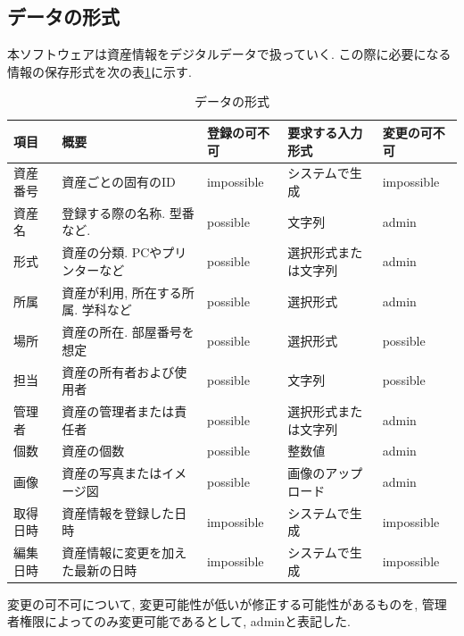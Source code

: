 \documentclass[11ptm]{jsarticle}
\begin{document}
\subsection{データの形式}
\label{subsec:データの形式}
本ソフトウェアは資産情報をデジタルデータで扱っていく. この際に必要になる情報の保存形式を次の表\ref{tb:データの形式}に示す.
\begin{table}[h]
  \caption{データの形式}
  \label{tb:データの形式}
  \centering
  \begin{tabular}{@{}l|l|l|l|l@{}}
    項目     & 概要                               & 登録の可不可 & 要求する入力形式     & 変更の可不可 \\
    \hline\hline
    資産番号 & 資産ごとの固有のID                 & impossible   & システムで生成       & impossible   \\
    \hline
    資産名   & 登録する際の名称. 型番など.        & possible     & 文字列               & admin        \\
    \hline
    形式     & 資産の分類. PCやプリンターなど     & possible     & 選択形式または文字列 & admin        \\
    \hline
    所属     & 資産が利用, 所在する所属. 学科など & possible     & 選択形式             & admin        \\
    \hline
    場所     & 資産の所在. 部屋番号を想定         & possible     & 選択形式             & possible     \\
    \hline
    担当     & 資産の所有者および使用者           & possible     & 文字列               & possible     \\
    \hline
    管理者   & 資産の管理者または責任者           & possible     & 選択形式または文字列 & admin        \\
    \hline
    個数     & 資産の個数                         & possible     & 整数値               & admin        \\
    \hline
    画像     & 資産の写真またはイメージ図         & possible     & 画像のアップロード   & admin        \\
    \hline\hline
    取得日時 & 資産情報を登録した日時             & impossible   & システムで生成       & impossible   \\
    \hline
    編集日時 & 資産情報に変更を加えた最新の日時   & impossible   & システムで生成       & impossible
  \end{tabular}
\end{table}\par
変更の可不可について, 変更可能性が低いが修正する可能性があるものを, 管理者権限によってのみ変更可能であるとして, adminと表記した.
\end{document}
